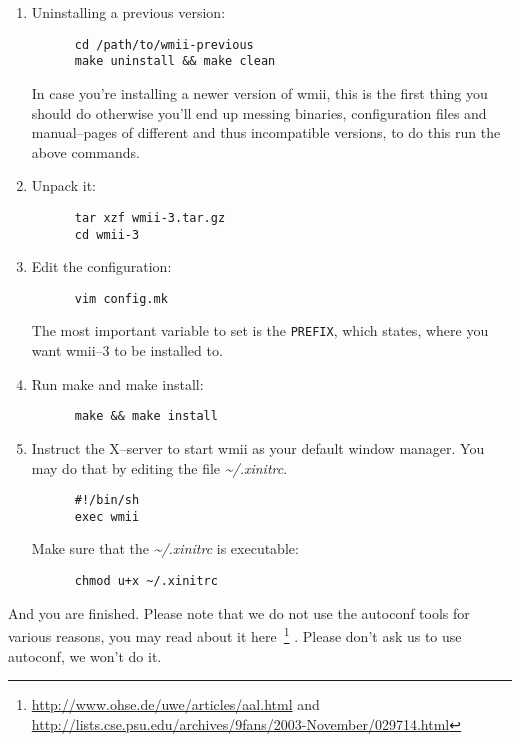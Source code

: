 \documentclass[12pt,a4paper]{article} %
\newcommand{\hrefx}[1]{\href{#1}{#1}} %
\begin{document}
    \begin{enumerate}
    
    \item Uninstalling a previous version:
    \begin{verbatim}
      cd /path/to/wmii-previous
      make uninstall && make clean 
    \end{verbatim}

    In case you're installing a newer version of wmii, this is the
    first thing you should do otherwise you'll end up messing
    binaries, configuration files and manual--pages of different and
    thus incompatible versions, to do this run the above commands.
    
    \item Unpack it:
    \begin{verbatim}
      tar xzf wmii-3.tar.gz
      cd wmii-3
    \end{verbatim}
  
    \item Edit the configuration:
    \begin{verbatim}
      vim config.mk
    \end{verbatim}
    
    The most important variable to set is the \verb+PREFIX+, which
    states, where you want wmii--3 to be installed to.
    
    \item Run make and make install:
    \begin{verbatim}
      make && make install
    \end{verbatim}
    
    \item Instruct the X--server to start wmii as your default window
    manager. You may do that by editing the file \emph{\~{}/.xinitrc}.

    \begin{verbatim}
      #!/bin/sh
      exec wmii
    \end{verbatim}

    Make sure that the \emph{\~{}/.xinitrc} is executable:

    \begin{verbatim}
      chmod u+x ~/.xinitrc
    \end{verbatim}

    \end{enumerate}
    
    And you are finished. Please note that we do not use the autoconf
    tools for various reasons, you may read about it here~\footnote{
    \hrefx{http://www.ohse.de/uwe/articles/aal.html} and
    \hrefx{http://lists.cse.psu.edu/archives/9fans/2003-November/029714.html}
    } . Please don't ask us to use autoconf, we won't do it.
\end{document}
